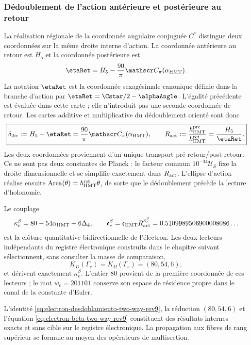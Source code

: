 \subsubsection{Dédoublement de l'action antérieure et postérieure au retour}
\label{sec:electron-desdoblamiento-two-way-rev9}

La réalisation régionale de la coordonnée angulaire conjuguée \(C^*\) distingue deux coordonnées sur la
même droite interne d'action. La coordonnée antérieure au retour est \(H_5\) et
la coordonnée postérieure est
\[
\etaRet
 =H_5-\frac{90}{\pi}\mathscr C_\pi(\alpha_{\rm HMT}).
\]
La notation \(\etaRet\) est la coordonnée sexagésimale canonique définie dans la
branche d'action par \(\etaRet=\Cstar/2-\alphaAngle\). L'égalité précédente est
évaluée dans cette carte ; elle n'introduit pas une seconde coordonnée de retour.
Les cartes additive et multiplicative du dédoublement orienté
sont donc
\begin{equation}
 \boxed{
 \delta_{2w}:=H_5-\etaRet
 =\frac{90}{\pi}\mathscr C_\pi(\alpha_{\rm HMT}),
 \qquad
 R_{\rm act}:=\frac{\hbar^{\rm pre}_{\rm HMT}}
 {\hbar^{\rm ret}_{\rm HMT}}
 =\frac{H_5}{\etaRet}.}
 \label{eq:electron-desdoblamiento-two-way-rev9}
\end{equation}
Les deux coordonnées proviennent d'un unique transport pré-retour/post-retour.
Ce ne sont pas deux constantes de Planck : le facteur commun
\(10^{-34}\mathcal U_S\) fixe la droite dimensionnelle et se simplifie exactement dans
\(R_{\rm act}\). L'ellipse d'action réalise ensuite
\(\operatorname{Area}(\theta)=\hbar_{\rm HMT}^{\rm ret}\theta\), de sorte que
le dédoublement précède la lecture d'holonomie.

Le couplage
\begin{equation}
 \kappa_e^{\beta}
 =80-54\alpha_{\rm HMT}+6\Delta_4,
 \qquad
 \mathfrak e_e^{\beta}
 =\mathfrak e_{\rm HMT}R_{\rm act}^{\kappa_e^{\beta}}
 =0.5109989506900008086\ldots
 \label{eq:electron-beta-two-way-rev9}
\end{equation}
est la clôture quantitative bidirectionnelle de l'électron. Les deux lecteurs
indépendants du registre électronique construits dans le chapitre suivant
sélectionnent, sans consulter la masse de comparaison,
\[
 K_D(\Gamma_e)=K_\Omega(\Gamma_e)=(80,54,6),
\]
et dérivent exactement \(\kappa_e^\beta\). L'entier \(80\) provient de la
première coordonnée de ces lecteurs ; le mot \(w_e=201101\) conserve son
espace de résidence propre dans le canal de la constante d'Euler.

\begin{statusbox}[title={Clôture interne du raffinement bidirectionnel}]
L'identité \eqref{eq:electron-desdoblamiento-two-way-rev9}, la réduction
\((80,54,6)\) et l'équation
\eqref{eq:electron-beta-two-way-rev9} constituent des résultats internes exacts
et sans cible sur le registre électronique. La propagation aux fibres de
rang supérieur se formule au moyen des opérateurs de multisection.
\end{statusbox}

